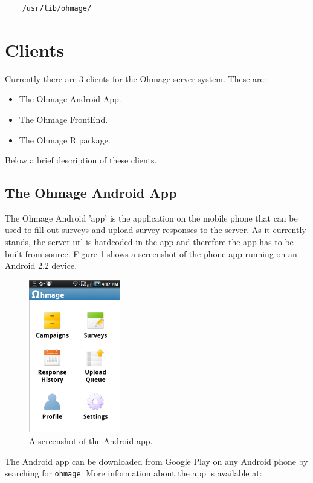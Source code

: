 \documentclass{scrartcl}
\begin{document}
\begin{verbatim}
    /usr/lib/ohmage/
\end{verbatim}

\section{Clients}

Currently there are 3 clients for the Ohmage server system. These are:

\begin{itemize}
  \item The Ohmage Android App.
  \item The Ohmage FrontEnd.
  \item The Ohmage R package.
\end{itemize}
Below a brief description of these clients.

\subsection{The Ohmage Android App}

The Ohmage Android 'app' is the application on the mobile phone that can be used
to fill out surveys and upload survey-responses to the server. As it currently
stands, the server-url is hardcoded in the app and therefore the app has to be
built from source. Figure \ref{fig:phone} shows a screenshot of the phone app running on
an Android 2.2 device. \\

\begin{figure}[h!]
\begin{center}
\includegraphics[width=4cm]{app.png}
\caption{A screenshot of the Android app.}
\label{fig:phone}
\end{center}
\end{figure}

\noindent The Android app can be downloaded from Google Play on any
Android phone by searching for \texttt{ohmage}. More information about the
app is available at: \\
\end{document}
